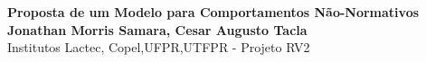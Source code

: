 \documentclass[a0,portrait]{a0poster}
\begin{document}


\begin{minipage}[b]{0.75\linewidth}
\veryHuge \color{NavyBlue} \textbf{Proposta de um Modelo para Comportamentos Não-Normativos } \color{Black}\\ %
\huge \textbf{Jonathan Morris Samara, Cesar Augusto Tacla}\\[0.5cm] %
\huge Institutos Lactec, Copel,UFPR,UTFPR - Projeto RV2\\[0.4cm] %
\end{minipage}
%
\vspace{1cm} %

\end{document}
